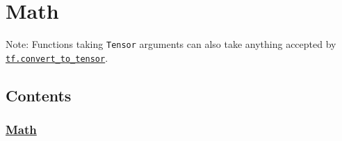 

\section{Math }\label{math}

Note: Functions taking \texttt{Tensor} arguments can also take anything
accepted by
\href{../../api_docs/python/framework.md\#convert_to_tensor}{\texttt{tf.convert\_to\_tensor}}.

\subsection{Contents}\label{contents}

\subsubsection{\texorpdfstring{\protect\hyperlink{AUTOGENERATED-math}{Math}}{Math}}\label{math-1}

